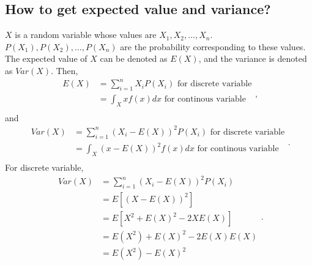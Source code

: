 \documentclass[10pt,onecolumn]{book}
\begin{document}
\subsection{How to get expected value and variance?}
$X$ is a random variable whose values are $X_{1}, X_{2}, ..., X_{n}$. $P(X_{1}), P(X_{2}), ..., P(X_{n})$ are the probability corresponding to these values. The expected value of $X$ can be denoted as $E(X)$, and the variance is denoted as $Var(X)$. Then, 
\begin{equation}
\begin{split}
	E(X) & = \sum_{i = 1}^{n} X_{i}P(X_{i}) \text{\ for discrete variable} \\
		 & = \int_{X}xf(x)dx \text{\ for continous variable} \\	
\end{split},
\end{equation}
and
\begin{equation}
\begin{split}
	Var(X) & = \sum_{i = 1}^{n} (X_{i} - E(X))^2 P(X_{i}) \text{\ for discrete variable} \\
		 & = \int_{X}(x - E(X))^2 f(x) dx  \text{\ for continous variable} \\	
\end{split}.
\end{equation}
For discrete variable, 
\begin{equation}
\begin{split}
	Var(X) & = \sum_{i = 1}^{n} (X_{i} - E(X))^2 P(X_{i}) \\
		   & = E[(X - E(X))^2] \\
		   & = E[X^2 + E(X)^2 - 2XE(X)] \\
		   & = E(X^2) + E(X)^2 - 2E(X)E(X) \\
		   & = E(X^2) - E(X)^2
\end{split}.
\end{equation}
\end{document}
